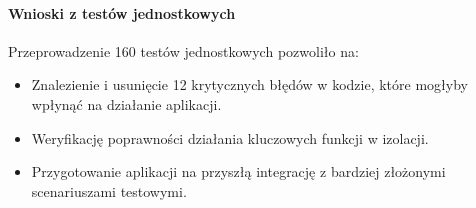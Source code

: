 \paragraph{Wnioski z testów jednostkowych}

Przeprowadzenie 160 testów jednostkowych pozwoliło na:
\begin{itemize}
    \item Znalezienie i usunięcie 12 krytycznych błędów w kodzie, które mogłyby wpłynąć na działanie aplikacji.
    \item Weryfikację poprawności działania kluczowych funkcji w izolacji.
    \item Przygotowanie aplikacji na przyszłą integrację z bardziej złożonymi scenariuszami testowymi.
\end{itemize}